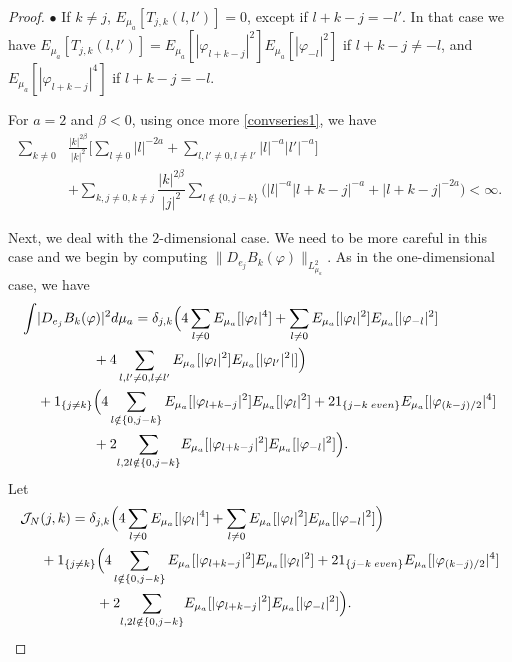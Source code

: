 \documentclass[10pt,a4paper]{amsart}
\begin{document}
\begin{proof}
\indent $\bullet$ If $k\neq j$, $E_{\mu_a}[T_{j,k}(l,l')]=0$, except if $ l+k-j=-l'$. In that case we have
$E_{\mu_a}[T_{j,k}(l,l')] = E_{\mu_a} [|\varphi_{l+k-j}|^2] E_{\mu_a} [|\varphi_{-l}|^2]$ if $l+k-j\neq -l$, and $E_{\mu_a} [|\varphi_{l+k-j}|^4]$ if
$l+k-j=  -l$. 
\bigskip

 For $a=2$ and $\beta <0$, using once more \eqref{convseries1}, 
  we have 
\begin{align*}
\sum_{k\neq 0} &\frac{|k|^{2\beta}}{|k|^2} \Big[ \sum_{l\neq 0} |l|^{-2a} + \sum_{l,l' \neq 0, l\neq l'} |l|^{-a} |l'|^{-a} \Big] \\
& + 
 \sum_{k,j\neq 0, k\neq j} \dfrac{|k|^{2\beta}}{|j|^{2}}  \sum_{l\notin \{0, j-k\}}\big(  |l|^{-a}|l+k-j|^{-a} +
 |l+k-j|^{-2a}\big) <\infty.
\end{align*} 



Next, we deal with the $2$-dimensional case. We need to be more careful in this case and we begin by computing $\|D_{e_j} B_k (\varphi)\|_{L^2_{\mu_a}}$. As in the one-dimensional case, we have
\begin{align*}
\int & |D_{e_j}B_k(\varphi)|^2 d\mu_a =   \delta_{j,k} \Big(  4 \sum_{l\neq 0}  E_{\mu_a}[|\varphi_l|^4] + \sum_{l\neq 0} E_{\mu_a}[|\varphi_l|^2]  E_{\mu_a}[|\varphi_{-l}|^2]\\
& \qquad \qquad + 4 \sum_{l,l'\neq 0, l\neq l'} E_{\mu_a} [|\varphi_l|^2] E_{\mu_a} [|\varphi_{l'}|^2|] \Big)\\
& + 1_{\{j\neq k\} } \Big( 4 \sum_{l  \notin \{0, j-k\} } E_{\mu_a}[ |\varphi_{l+k-j}|^2]  E_{\mu_a}[ |\varphi_l|^2]  +2 1_{\{ j-k \; {\rm even}\}} E_{\mu_a} [ |\varphi_{(k-j)/2}|^4]  \\
& \qquad \qquad +2  { \sum_{l,2l \notin \{0, j-k\}} } E_{\mu_a}[ |\varphi_{l+k-j}|^2]  E_{\mu_a}[ |\varphi_{-l}|^2] \Big).
\end{align*}
Let 
\begin{align*}
 {\mathcal J}_N&(j,k)= \delta_{j,k} \Big(  4 \sum_{l\neq 0}  E_{\mu_a}[|\varphi_l|^4] + \sum_{l\neq 0} E_{\mu_a}[|\varphi_l|^2]  E_{\mu_a}[|\varphi_{-l}|^2] \Big) \\
&+  1_{\{j\neq k\} }\Big(  4 \sum_{l  \notin \{0, j-k\} } E_{\mu_a}[ |\varphi_{l+k-j}|^2]  E_{\mu_a}[ |\varphi_l|^2]  +2 1_{\{ j-k \; {\rm even}\}} E_{\mu_a} [ |\varphi_{(k-j)/2}|^4]  \\
& \qquad \qquad +2 {  \sum_{l,2l \notin \{0, j-k\}} } E_{\mu_a}[ |\varphi_{l+k-j}|^2]  E_{\mu_a}[ |\varphi_{-l}|^2] \Big).
\end{align*}



\end{proof}
\end{document}
